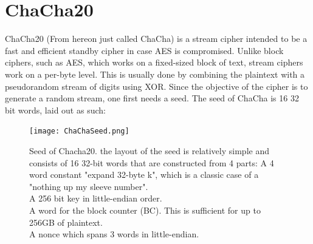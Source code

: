 \documentclass[a4paper, openany]{book}
\begin{document}
\section{ChaCha20}
\label{ChaChaalg}
ChaCha20 (From hereon just called ChaCha) is a stream cipher intended to be a fast and efficient standby cipher in case AES is compromised\cite{rfc7539}. Unlike block ciphers, such as AES, which works on a fixed-sized block of text, stream ciphers work on a per-byte level. This is usually done by combining the plaintext with a pseudorandom stream of digits using XOR. Since the objective of the cipher is to generate a random stream, one first needs a seed. The seed of ChaCha is 16 32 bit words, laid out as such:

\begin{figure}[!htb]
\centering
\captionsetup{width=.8\linewidth}
\texttt{[image: ChaChaSeed.png]}
\caption[Seed of ChaCha20]%
{Seed of Chacha20. the layout of the seed is relatively simple and consists of 16 32-bit words that are constructed from 4 parts:
A 4 word constant "expand 32-byte k", which is a classic case of a "nothing up my sleeve number".\\
A 256 bit key in little-endian order.\\
A word for the block counter (BC). This is sufficient for up to 256GB of plaintext.\\
A nonce which spans 3 words in little-endian.}
\label{fig:ChaChaSeed}
\end{figure}
\end{document}
